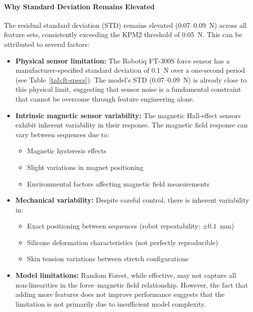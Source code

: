 \documentclass[11pt,a4paper]{article}
\begin{document}
\paragraph{Why Standard Deviation Remains Elevated}
The residual standard deviation (STD) remains elevated (0.07--0.09~N) across all feature sets, consistently exceeding the KPM2 threshold of 0.05~N. This can be attributed to several factors:

\begin{itemize}[leftmargin=1.5em]
    \item \textbf{Physical sensor limitation:} The Robotiq FT-300S force sensor has a manufacturer-specified standard deviation of 0.1~N over a one-second period (see Table~\ref{tab:ft-specs}). The model's STD (0.07--0.09~N) is already close to this physical limit, suggesting that sensor noise is a fundamental constraint that cannot be overcome through feature engineering alone.
    
    \item \textbf{Intrinsic magnetic sensor variability:} The magnetic Hall-effect sensors exhibit inherent variability in their response. The magnetic field response can vary between sequences due to:
    \begin{itemize}[leftmargin=1.5em]
        \item Magnetic hysteresis effects
        \item Slight variations in magnet positioning
        \item Environmental factors affecting magnetic field measurements
    \end{itemize}
    
    \item \textbf{Mechanical variability:} Despite careful control, there is inherent variability in:
    \begin{itemize}[leftmargin=1.5em]
        \item Exact positioning between sequences (robot repeatability: $\pm 0.1$~mm)
        \item Silicone deformation characteristics (not perfectly reproducible)
        \item Skin tension variations between stretch configurations
    \end{itemize}
    
    \item \textbf{Model limitations:} Random Forest, while effective, may not capture all non-linearities in the force--magnetic field relationship. However, the fact that adding more features does not improve performance suggests that the limitation is not primarily due to insufficient model complexity.
\end{itemize}
\end{document}
